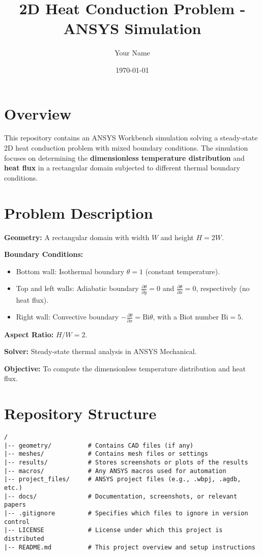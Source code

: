 \documentclass{article}
\begin{document}
\title{2D Heat Conduction Problem - ANSYS Simulation}
\author{Your Name}
\date{\today}
\maketitle

\section*{Overview}
This repository contains an ANSYS Workbench simulation solving a steady-state 2D heat conduction problem with mixed boundary conditions. The simulation focuses on determining the \textbf{dimensionless temperature distribution} and \textbf{heat flux} in a rectangular domain subjected to different thermal boundary conditions.

\section*{Problem Description}
\textbf{Geometry:} A rectangular domain with width \( W \) and height \( H = 2W \).

\textbf{Boundary Conditions:}
\begin{itemize}
    \item Bottom wall: Isothermal boundary \( \theta = 1 \) (constant temperature).
    \item Top and left walls: Adiabatic boundary \( \frac{\partial \theta}{\partial y} = 0 \) and \( \frac{\partial \theta}{\partial x} = 0 \), respectively (no heat flux).
    \item Right wall: Convective boundary \( -\frac{\partial \theta}{\partial x} = \text{Bi} \theta \), with a Biot number \( \text{Bi} = 5 \).
\end{itemize}

\textbf{Aspect Ratio:} \( H/W = 2 \).

\textbf{Solver:} Steady-state thermal analysis in ANSYS Mechanical.

\textbf{Objective:} To compute the dimensionless temperature distribution and heat flux.

\section*{Repository Structure}
\begin{verbatim}
/
|-- geometry/          # Contains CAD files (if any)
|-- meshes/            # Contains mesh files or settings
|-- results/           # Stores screenshots or plots of the results
|-- macros/            # Any ANSYS macros used for automation
|-- project_files/     # ANSYS project files (e.g., .wbpj, .agdb, etc.)
|-- docs/              # Documentation, screenshots, or relevant papers
|-- .gitignore         # Specifies which files to ignore in version control
|-- LICENSE            # License under which this project is distributed
|-- README.md          # This project overview and setup instructions
\end{verbatim}
\end{document}
